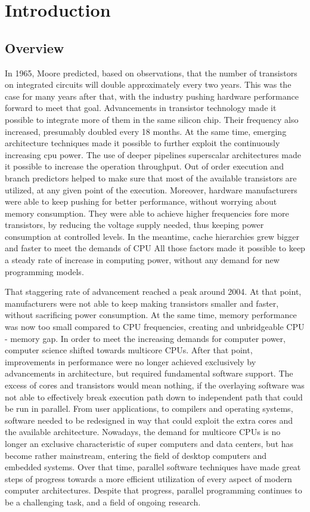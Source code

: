 \def\<#1>{\textit{#1}}


\chapter{Introduction}
\section{Overview}

In 1965, Moore predicted, based on observations, that the number of transistors on integrated circuits will double approximately every two years. This was the case for many years after that, with the industry pushing hardware performance forward to meet that goal. Advancements in transistor technology made it possible to integrate more of them in the same silicon chip. Their frequency also increased, presumably doubled every 18 months. At the same time, emerging architecture techniques made it possible to further exploit the continuously increasing cpu power. The use of deeper pipelines superscalar architectures made it possible to increase the operation throughput. Out of order execution and branch predictors helped to make sure that most of the available transistors are utilized, at any given point of the execution. Moreover, hardware manufacturers were able to keep pushing for better performance, without worrying about memory consumption. They were able to achieve higher frequencies fore more transistors, by reducing the voltage supply needed, thus keeping power consumption at controlled levels. In the meantime, cache hierarchies  grew bigger and faster to meet the demands of CPU All those factors made it possible to keep a steady rate of increase in computing power, without any demand for new programming models.

That staggering rate of advancement reached a peak around 2004. At that point, manufacturers were not able to keep making transistors smaller and faster, without sacrificing power consumption. At the same time, memory performance was now too small compared to CPU frequencies, creating and unbridgeable CPU -  memory gap. In order to meet the increasing demands for computer power, computer science shifted towards multicore CPUs. After that point, improvements in performance were no longer achieved exclusively by advancements in architecture, but required fundamental software support. The excess of cores and transistors would mean nothing, if the overlaying software was not able to effectively break execution path down to independent path that could be run in parallel. From user applications, to compilers and operating systems, software needed to be redesigned in way that could exploit the extra cores and the available architecture. Nowadays, the demand for multicore CPUs is no longer an exclusive characteristic of super computers and data centers, but has become rather mainstream, entering the field of desktop computers and embedded systems. Over that time, parallel software techniques have made great steps of progress towards a more efficient utilization of every aspect of modern computer architectures. Despite that progress, parallel programming continues to be a challenging task, and a field of ongoing research.

